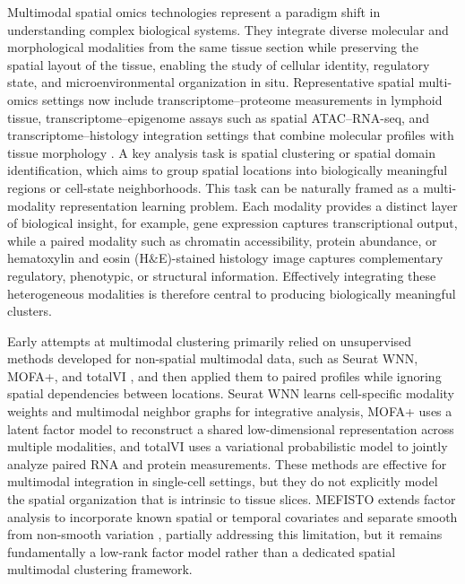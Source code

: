 \documentclass{article}
\theoremstyle{plain}
\theoremstyle{definition}
\begin{document}
Multimodal spatial omics technologies represent a paradigm shift in understanding complex biological systems. They integrate diverse molecular and morphological modalities from the same tissue section while preserving the spatial layout of the tissue, enabling the study of cellular identity, regulatory state, and microenvironmental organization in situ. Representative spatial multi-omics settings now include transcriptome--proteome measurements in lymphoid tissue, transcriptome--epigenome assays such as spatial ATAC--RNA-seq, and transcriptome--histology integration settings that combine molecular profiles with tissue morphology \cite{long2024spatialglue,zhang2023spatial,zuo2023misar,xu2024miso}. A key analysis task is spatial clustering or spatial domain identification, which aims to group spatial locations into biologically meaningful regions or cell-state neighborhoods. This task can be naturally framed as a multi-modality representation learning problem. Each modality provides a distinct layer of biological insight, for example, gene expression captures transcriptional output, while a paired modality such as chromatin accessibility, protein abundance, or hematoxylin and eosin (H$\&$E)-stained histology image captures complementary regulatory, phenotypic, or structural information. Effectively integrating these heterogeneous modalities is therefore central to producing biologically meaningful clusters.

Early attempts at multimodal clustering primarily relied on unsupervised methods developed for non-spatial multimodal data, such as Seurat WNN, MOFA+, and totalVI \cite{hao2021seurat,argelaguet2020mofa,gayoso2021totalvi}, and then applied them to paired profiles while ignoring spatial dependencies between locations. Seurat WNN learns cell-specific modality weights and multimodal neighbor graphs for integrative analysis, MOFA+ uses a latent factor model to reconstruct a shared low-dimensional representation across multiple modalities, and totalVI uses a variational probabilistic model to jointly analyze paired RNA and protein measurements. These methods are effective for multimodal integration in single-cell settings, but they do not explicitly model the spatial organization that is intrinsic to tissue slices. MEFISTO extends factor analysis to incorporate known spatial or temporal covariates and separate smooth from non-smooth variation \cite{velten2022mefisto}, partially addressing this limitation, but it remains fundamentally a low-rank factor model rather than a dedicated spatial multimodal clustering framework.
\end{document}
